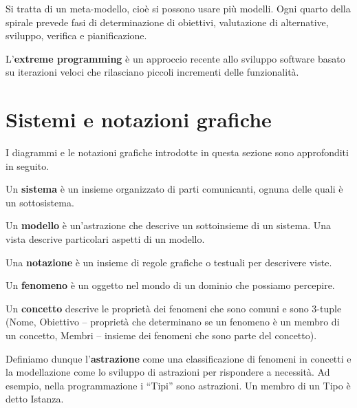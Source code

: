 \documentclass{article}
\begin{document}
        Si tratta di un meta-modello, cioè si possono usare più modelli. Ogni quarto della spirale prevede fasi di determinazione di obiettivi, valutazione di alternative, sviluppo, verifica e pianificazione. 
    
        \vspace{3mm}
    
        L’\textbf{extreme programming} è un approccio recente allo sviluppo software basato su iterazioni veloci che rilasciano piccoli incrementi delle funzionalità.

\section{Sistemi e notazioni grafiche}

    I diagrammi e le notazioni grafiche introdotte in questa sezione sono approfonditi in seguito.
    
    \vspace{3mm}

    Un \textbf{sistema} è un insieme organizzato di parti comunicanti, ognuna delle quali è un sottosistema. 
    
    \vspace{3mm}
    
    Un \textbf{modello} è un’astrazione che descrive un sottoinsieme di un sistema. Una vista descrive particolari aspetti di un modello. 
    
    \vspace{3mm}
    
    Una \textbf{notazione} è un insieme di regole grafiche o testuali per descrivere viste. 
    
    \vspace{3mm}
    
    Un \textbf{fenomeno} è un oggetto nel mondo di un dominio che possiamo percepire. 
    
    \vspace{3mm}
    
    Un \textbf{concetto} descrive le proprietà dei fenomeni che sono comuni e sono 3-tuple (Nome, Obiettivo – proprietà che determinano se un fenomeno è un membro di un concetto, Membri – insieme dei fenomeni che sono parte del concetto).
    
    \vspace{3mm}
    
    Definiamo dunque l’\textbf{astrazione} come una classificazione di fenomeni in concetti e la modellazione come lo sviluppo di astrazioni per rispondere a necessità. Ad esempio, nella programmazione i “Tipi” sono astrazioni. Un membro di un Tipo è detto Istanza.
    
\end{document}
